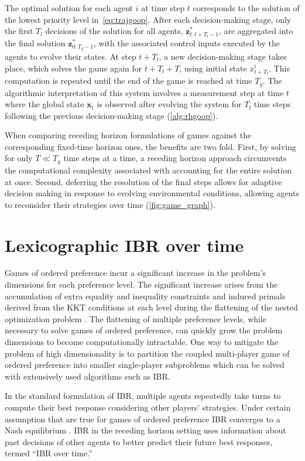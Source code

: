 The optimal solution for each agent \(i\) at time step \(t\) corresponds
to the solution of the lowest priority level in~\cref{eq:trajgoop}.
After each decision-making stage, only the first \(T_l\) decisions
of the solution for all agents, \(\mathbf{z}^{*}_{t:t+T_l-1}\),
are aggregated into the final solution \(\mathbf{z}^*_{0:T_g-1}\),
with the associated control inputs
executed by the agents to evolve their states.
At step \(t+T_l\), a new decision-making stage takes place,
which solves the game again for \(t+T_l+T\),
using initial state \(x^i_{t+T_l}\).
This computation is repeated until the end of the game
is reached at time \(T_g\).
The algorithmic interpretation of this system involves
a measurement step at time \(t\) where the global state \(\mathbf{x}_t\) is observed
after evolving the system for \(T_l\) time steps following the previous decision-making
stage (\cref{alg:rhgoop}).


When comparing receding horizon formulations of games
against the corresponding fixed-time horizon ones, the benefits are two fold.
First, by solving for only \(T \ll T_g\) time steps at a time,
a receding horizon approach circumvents the computational
complexity associated with accounting for the entire solution at once.
Second, deferring the resolution of the final steps allows for adaptive
decision making in response to evolving environmental conditions,
allowing agents to reconsider their strategies over time (\cref{fig:game_graph}).


\section{Lexicographic IBR over time}

Games of ordered preference
incur a significant increase
in the problem's dimensions for each preference level.
The significant increase arises from the accumulation
of extra equality and inequality constraints and induced primals
derived from the KKT conditions at each level
during the flattening of the nested optimization problem \cite{lee:2025}.
The flattening of multiple preference levels, while necessary to solve games
of ordered preference, can quickly grow the problem dimensions
to become computationally intractable.
One way to mitigate the problem of high dimensionality
is to partition the coupled multi-player game of ordered preference
into smaller single-player subproblems
which can be solved with extensively used algorithms such as IBR.

In the standard formulation of IBR, multiple agents repeatedly take turns to
compute their best response considering other players' strategies.
Under certain assumption that are true for games of ordered preference
IBR converges to a Nash equilibrium \cite{fridovich-keil:2024}.
IBR in the receding horizon setting
uses information about past decisions of other agents
to better predict their future best responses, termed ``IBR over time.''

